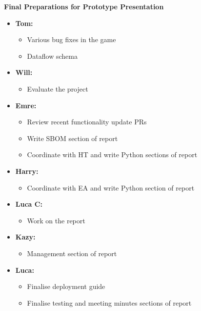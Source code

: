\documentclass[11pt]{article}
\begin{document}
    \textbf{Final Preparations for Prototype Presentation}
    \begin{itemize}
        \item \textbf{Tom:}
        \begin{itemize}
            \item Various bug fixes in the game
            \item Dataflow schema
        \end{itemize}

        \item \textbf{Will:}
        \begin{itemize}
            \item Evaluate the project
        \end{itemize}

        \item \textbf{Emre:}
        \begin{itemize}
            \item Review recent functionality update PRs
            \item Write SBOM section of report
            \item Coordinate with HT and write Python sections of report
        \end{itemize}

        \item \textbf{Harry:}
        \begin{itemize}
            \item Coordinate with EA and write Python section of report
        \end{itemize}

        \item \textbf{Luca C:}
        \begin{itemize}
            \item Work on the report
        \end{itemize}

        \item \textbf{Kazy:}
        \begin{itemize}
            \item Management section of report
        \end{itemize}

        \item \textbf{Luca:}
        \begin{itemize}
            \item Finalise deployment guide
            \item Finalise testing and meeting minutes sections of report
        \end{itemize}
    \end{itemize}
\end{document}
